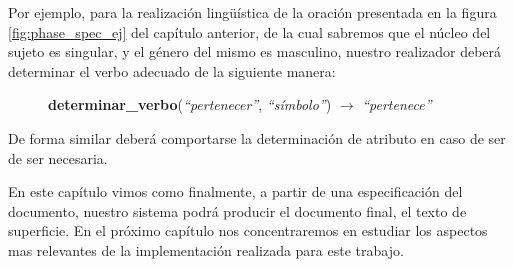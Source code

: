 Por ejemplo, para la realización lingüística de la oración presentada en la figura \ref{fig:phase_spec_ej} del capítulo anterior, de la cual sabremos que el núcleo del sujeto es singular, y el género del mismo es masculino, nuestro realizador deberá determinar el verbo adecuado de la siguiente manera:

\begin{figure}[H]
\centering
\textbf{determinar\_verbo}(\emph{``pertenecer''}, \emph{``símbolo''}) $\rightarrow$ \emph{``pertenece''}
\end{figure}

\noindent
De forma similar deberá comportarse la determinación de atributo en caso de ser de ser necesaria. 

\bigskip
En este capítulo vimos como finalmente, a partir de una especificación del documento, nuestro sistema podrá producir el documento final, el texto de superficie. En el próximo capítulo nos concentraremos en estudiar los aspectos mas relevantes de la implementación realizada para este trabajo.